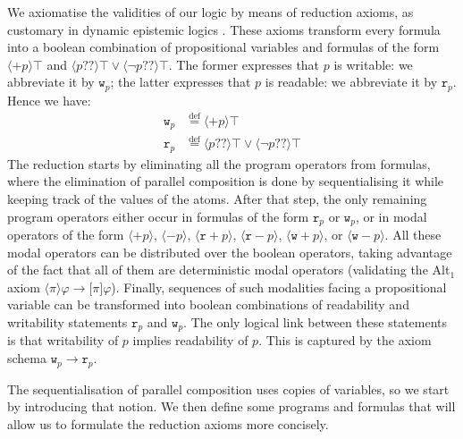 \documentclass{llncs}
\newcommand{\readable}[1]{\mathtt{r}_{#1}}
\newcommand{\writable}[1]{\mathtt{w}_{#1}}
\newcommand{\testendo}{?\!\!?}			%
\newcommand{\assgntopR}[1]{{\mathtt r {+} #1}}
\newcommand{\assgnbotR}[1]{{\mathtt r {-} #1}}
\newcommand{\assgntopW}[1]{{\mathtt w {+} #1}}
\newcommand{\assgnbotW}[1]{{\mathtt w {-} #1}}
\newcommand{\assgntopV}[1]{{\mathtt {+} #1}}
\newcommand{\assgnbotV}[1]{{\mathtt {-} #1}}
\newcommand{\eqdef}{\stackrel{\text{def}}{=}}
\newcommand{\lbox}[1]{ \big[ #1 \big] }
\newcommand{\ldia}[1]{ \big\langle #1 \big\rangle}
\newcommand{\leqv}{ \leftrightarrow }
\newcommand{\limp}{ \rightarrow }
\renewcommand{\phi}{\varphi}
\begin{document}
We axiomatise the validities of our logic by means of reduction axioms, as customary in dynamic epistemic logics \cite{DitmarschHoekKooi07}. 
These axioms transform every formula into a boolean combination of propositional variables
and formulas of the form
$\ldia{ \assgntopV p } \top $ and 
$\ldia{ p \testendo} \top \lor \ldia{ \lnot p \testendo} \top $. 
The former expresses that $p$ is writable: we abbreviate it by $\writable{p}$;
the latter expresses that $p$ is readable: we abbreviate it by $\readable p$. 
Hence we have:
\begin{align*}
\writable{p} &\eqdef \ldia{ \assgntopV p } \top 
\\
\readable p &\eqdef \ldia{ p \testendo} \top \lor \ldia{ \lnot p \testendo} \top 
\end{align*}
The reduction starts by eliminating all the program operators from formulas, where 
the elimination of parallel composition is done by sequentialising it while keeping track of the values of the atoms. 
After that step, the only remaining program operators 
either occur in formulas of the form $\readable p$ or $\writable p$, 
or in modal operators of the form
$\ldia{ \assgntopV p} $,
$\ldia{ \assgnbotV p} $,
$\ldia{ \assgntopR p} $,
$\ldia{ \assgnbotR p} $,
$\ldia{ \assgntopW p} $, or
$\ldia{ \assgnbotW p} $. 
All these modal operators can be distributed over the boolean operators, taking advantage of the fact that all of them are deterministic modal operators 
(validating the Alt$_1$ axiom $\ldia \pi \phi \limp \lbox \pi \phi$). 
Finally, sequences of such modalities facing a propositional variable can be transformed into 
boolean combinations of readability and writability statements $\readable p$ and $\writable p$.
The only logical link between these statements is that 
writability of $p$ implies readability of $p$. 
This is captured by the axiom schema 
$\writable p \limp \readable p$.

The sequentialisation of parallel composition uses copies of variables, so we start by introducing that notion. 
We then define some programs and formulas 
that will allow us to formulate the reduction axioms more concisely. 
\end{document}
